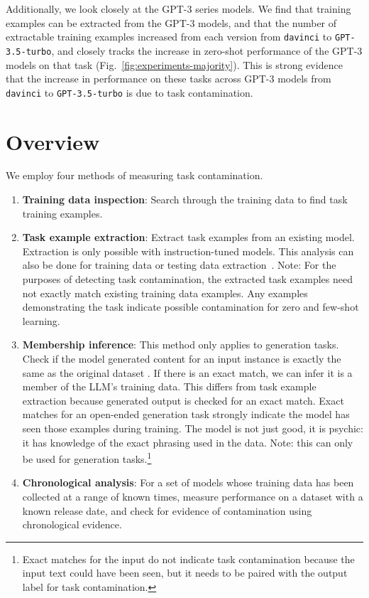 \documentclass[letterpaper]{article} %
\newcommand{\jmf}[1]{}      %
\begin{document}
Additionally, we look closely at the GPT-3 series models. We find that training examples can be extracted from the GPT-3 models, and that the number of extractable training examples increased from each version from \texttt{davinci} to \texttt{GPT-3.5-turbo}, and closely tracks the increase in zero-shot performance of the  GPT-3 models on that task (Fig.~\ref{fig:experiments-majority}).  This is strong evidence that the increase in performance on these tasks across GPT-3 models from  \texttt{davinci} to \texttt{GPT-3.5-turbo} is due to task contamination.


\section{Overview}

We employ four methods of measuring task contamination.\jmf{Add a figure containing examples of each of these.}

\begin{enumerate}
\item \textbf{Training data inspection}: Search through the training data to find task training examples.

\item \textbf{Task example extraction}: Extract task examples from an existing model. Extraction is only possible with instruction-tuned models. This analysis can also be done for training data or testing data extraction~\cite{lm-contamination}. Note: For the purposes of detecting task contamination, the extracted task examples need not exactly match existing training data examples. Any examples demonstrating the task indicate possible contamination for zero and few-shot learning.

\item \textbf{Membership inference}: This method only applies to generation tasks.  Check if the model generated content for an input instance is exactly the same as the original dataset \cite{hu2022}\jmf{add inter-alia}. If there is an exact match, we can infer it is a member of the LLM's training data. This differs from task example extraction because generated output is checked for an exact match.  Exact matches for an open-ended generation task strongly indicate the model has seen those examples during training.  The model is not just good, it is psychic: it has knowledge of the exact phrasing used in the data. Note: this can only be used for generation tasks.\footnote{Exact matches for the input do not indicate task contamination because the input text could have been seen, but it needs to be paired with the output label for task contamination.}  %

\item \textbf{Chronological analysis}: For a set of models whose training data has been collected at a range of known times, measure performance on a dataset with a known release date, and check for evidence of contamination using chronological evidence.

\end{enumerate}
\end{document}
